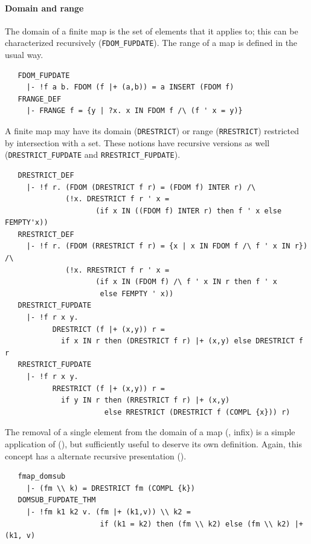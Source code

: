 \paragraph {Domain and range}

The domain of a finite map is the set of elements that it applies to;
this can be characterized recursively
({\small\verb+FDOM_FUPDATE+}). The range of a map is defined in the
usual way.
\begin{hol}
\begin{verbatim}
   FDOM_FUPDATE
     |- !f a b. FDOM (f |+ (a,b)) = a INSERT (FDOM f)
   FRANGE_DEF
     |- FRANGE f = {y | ?x. x IN FDOM f /\ (f ' x = y)}
\end{verbatim}
\end{hol}
%
A finite map may have its domain ({\small\verb+DRESTRICT+})
or range ({\small\verb+RRESTRICT+}) restricted by intersection with a
set. These notions have recursive versions as well
({\small\verb+DRESTRICT_FUPDATE+} and {\small\verb+RRESTRICT_FUPDATE+}).
%
\begin{hol}
\begin{verbatim}
   DRESTRICT_DEF
     |- !f r. (FDOM (DRESTRICT f r) = (FDOM f) INTER r) /\
              (!x. DRESTRICT f r ' x =
                     (if x IN ((FDOM f) INTER r) then f ' x else FEMPTY'x))
   RRESTRICT_DEF
     |- !f r. (FDOM (RRESTRICT f r) = {x | x IN FDOM f /\ f ' x IN r}) /\
              (!x. RRESTRICT f r ' x =
                     (if x IN (FDOM f) /\ f ' x IN r then f ' x
                      else FEMPTY ' x))
   DRESTRICT_FUPDATE
     |- !f r x y.
           DRESTRICT (f |+ (x,y)) r =
             if x IN r then (DRESTRICT f r) |+ (x,y) else DRESTRICT f r
   RRESTRICT_FUPDATE
     |- !f r x y.
           RRESTRICT (f |+ (x,y)) r =
             if y IN r then (RRESTRICT f r) |+ (x,y)
                       else RRESTRICT (DRESTRICT f (COMPL {x})) r)
\end{verbatim}
\end{hol}
The removal of a single element from the domain of a map
(\holtxt{\bs\bs}, infix) is a simple application of
(\holtxt{DRESTRICT}), but sufficiently useful to deserve its own
definition. Again, this concept has a alternate recursive presentation
(\holtxt{DOMSUB\_FUPDATE\_THM}).
%
\begin{hol}
\begin{verbatim}
   fmap_domsub
     |- (fm \\ k) = DRESTRICT fm (COMPL {k})
   DOMSUB_FUPDATE_THM
     |- !fm k1 k2 v. (fm |+ (k1,v)) \\ k2 =
                      if (k1 = k2) then (fm \\ k2) else (fm \\ k2) |+ (k1, v)
\end{verbatim}
\end{hol}

